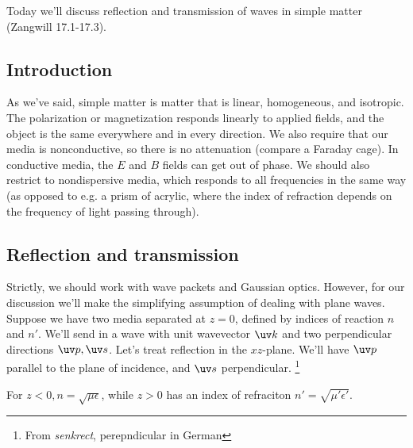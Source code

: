 Today we'll discuss reflection and transmission of waves in simple matter (Zangwill 17.1-17.3).
\subsection*{Introduction}
As we've said, simple matter is matter that is linear, homogeneous, and isotropic. The polarization or magnetization responds linearly to applied fields, and the object is the same everywhere and in every direction.
We also require that our media is nonconductive, so there is no attenuation (compare a Faraday cage). In conductive media, the $E$ and $B$ fields can get out of phase. We should also restrict to nondispersive media, which responds to all frequencies in the same way (as opposed to e.g. a prism of acrylic, where the index of refraction depends on the frequency of light passing through).

\subsection*{Reflection and transmission}
Strictly, we should work with wave packets and Gaussian optics. However, for our discussion we'll make the simplifying assumption of dealing with plane waves. Suppose we have two media separated at $z=0$, defined by indices of reaction $n$ and $n'$. We'll send in a wave with unit wavevector $\uv k$ and two perpendicular directions $\uv p,\uv s$. Let's treat reflection in the $xz$-plane. We'll have $\uv p$ parallel to the plane of incidence, and $\uv s$ perpendicular.%
    \footnote{From \emph{senkrect}, perepndicular in German}

For $z<0, n = \sqrt{\mu \epsilon}$, while $z>0$ has an index of refraciton $n'= \sqrt{\mu' \epsilon'}$.

